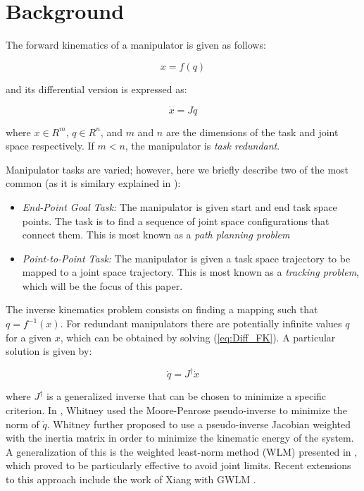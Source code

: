 \documentclass[conference]{IEEEtran}
\newcommand{\J}{\ensuremath{J}}
\newcommand{\Jps}{\ensuremath{J^{\dagger}}}
\newcommand{\dx}{\ensuremath{\dot{x}}}
\newcommand{\dq}{\ensuremath{\dot{q}}}
\newcommand{\q}{\ensuremath{q}}
\begin{document}
\section{Background}
\label{sec:Background}
The forward kinematics of a manipulator is given as follows:

\begin{equation}
x = f(\q)
\label{eq:FK}
\end{equation}

and its differential version is expressed as:

\begin{equation}
\dot{x} = \J \dq
\label{eq:Diff_FK}
\end{equation}

where $x \in R^{m}$, $\q \in R^{n}$, and $m$ and $n$ are the dimensions
of the task and joint space respectively. If $m < n$, the manipulator is
\emph{task redundant}. 

Manipulator tasks are varied; however, here we briefly describe two of the most
common (as it is similary explained in \cite{seereeram-ns-1995}):

\begin{itemize}
\item{\textit{End-Point Goal Task:} The manipulator is given start and end task space points. 
The task is to find a sequence of joint space configurations that connect them. 
This is most known as a \textit{path planning problem} } 
\item{\textit{Point-to-Point Task:} The manipulator is given a task space trajectory to be mapped
to a joint space trajectory. This is most known as a \textit{tracking problem}, which will be 
the focus of this paper.}
\end{itemize}

The inverse kinematics problem consists on finding a mapping such that $\q = f^{-1}(x)$. For
redundant manipulators there are potentially infinite values $\q$ for a given $x$, which can be obtained
by solving (\ref{eq:Diff_FK}). A particular solution is given by:

\begin{equation}
\dq = \Jps \dx
\label{eq:IK_ParticularSol}
\end{equation}

where $\Jps$ is a generalized inverse that can be chosen to minimize a specific criterion. 
In \cite{Whitney-motionRate-1969}, Whitney used the Moore-Penrose pseudo-inverse to minimize the norm of $\dq$. 
Whitney further proposed to use a pseudo-inverse Jacobian weighted with the inertia matrix in 
order to minimize the kinematic energy of the system. A generalization of this is the weighted 
least-norm method (WLM) presented in \cite{chan-ns-1995}, which proved to be particularly effective 
to avoid joint limits. Recent extensions to this approach include the work of Xiang with GWLM 
\cite{xiang-ns-2010}.  
\medskip
\end{document}

